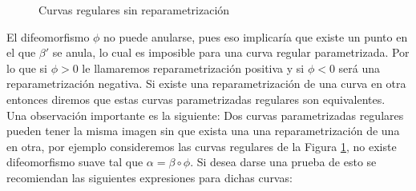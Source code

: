 \documentclass[oneside,11pt]{memoir}
\begin{document}
\begin{figure}[h]

\caption{Curvas regulares sin reparametrización}
\label{fig:norepar}
\end{figure}
El difeomorfismo $\phi$ no puede anularse, pues eso implicaría que existe un punto en el que $\beta'$ se anula, lo cual es imposible para una curva regular parametrizada. Por lo que si $\phi>0$ le llamaremos reparametrización positiva y si $\phi<0$ será una reparametrización negativa. Si existe una reparametrización de una curva en otra entonces diremos que estas curvas parametrizadas regulares son equivalentes. \\ Una observación importante es la siguiente: Dos curvas parametrizadas regulares pueden tener la misma imagen sin que exista una una reparametrización de una en otra, por ejemplo consideremos las curvas regulares de la Figura \ref{fig:norepar}, no existe difeomorfismo suave tal que $\alpha=\beta\circ\phi$. Si desea darse una prueba de esto se recomiendan las siguientes expresiones para dichas curvas:
\end{document}
